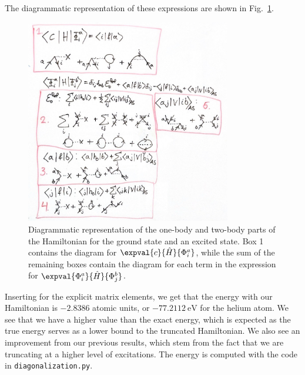 The diagrammatic representation of these expressions are shown in Fig.~\ref{fig:ground-excited}.
\begin{figure}
    \centering
    \includegraphics[width=0.8\textwidth]{figs/ground-excited.pdf}
    \caption{
        Diagrammatic representation of the one-body and two-body parts of the Hamiltonian for the ground state and an excited state.
        Box 1 contains the diagram for $\expval{c}{\hat{H}}{\Phi_i^a}$, while the sum of the remaining boxes contain the diagram for each term in the expression for $\expval{\Phi_i^a}{\hat{H}}{\Phi_{j}^{b}}$.\label{fig:ground-excited}
    }
\end{figure}

Inserting for the explicit matrix elements, we get that the energy with our Hamiltonian is $-2.8386$ atomic units, or $-77.2112 \ \text{eV}$ for the helium atom.
We see that we have a higher value than the exact energy, which is expected as the true energy serves as a lower bound to the truncated Hamiltonian.
We also see an improvement from our previous results, which stem from the fact that we are truncating at a higher level of excitations.
The energy is computed with the code in \verb|diagonalization.py|.
